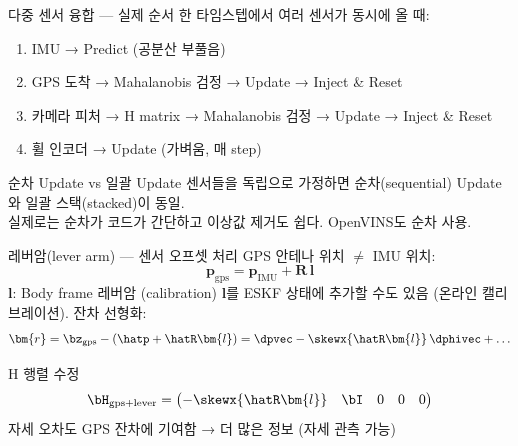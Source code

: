 \begin{frame}{다중 센서 융합 — 실제 순서}
  한 타임스텝에서 여러 센서가 동시에 올 때:
  \vspace{0.3em}
  \begin{enumerate}
    \item IMU → Predict (공분산 부풀음)
    \item GPS 도착 → Mahalanobis 검정 → Update → Inject \& Reset
    \item 카메라 피처 → H matrix → Mahalanobis 검정 → Update → Inject \& Reset
    \item 휠 인코더 → Update (가벼움, 매 step)
  \end{enumerate}
  \pause
  \vspace{0.3em}
  \begin{alertblock}{순차 Update vs 일괄 Update}
    센서들을 독립으로 가정하면 순차(sequential) Update와 일괄 스택(stacked)이 동일.\\
    실제로는 순차가 코드가 간단하고 이상값 제거도 쉽다. OpenVINS도 순차 사용.
  \end{alertblock}
\end{frame}

\begin{frame}{레버암(lever arm) — 센서 오프셋 처리}
  GPS 안테나 위치 $\ne$ IMU 위치:
  \[
    \bm{p}_\text{gps} = \bm{p}_\text{IMU} + \bm{R}\,\bm{l}
  \]
  $\bm{l}$: Body frame 레버암 (calibration)
  \vspace{0.3em}
  \pause
  $\bm{l}$를 ESKF 상태에 추가할 수도 있음 (온라인 캘리브레이션).
  \vspace{0.2em}
  잔차 선형화:
  \[
    \bm{r} = \bz_\text{gps} - (\hatp + \hatR\bm{l}) = \dpvec - \skewx{\hatR\bm{l}}\,\dphivec + \ldots
  \]
  \pause
  \begin{block}{H 행렬 수정}
    \[
      \bH_\text{gps+lever} = \begin{pmatrix}
        -\skewx{\hatR\bm{l}} & \bI & 0 & 0 & 0
      \end{pmatrix}
    \]
    자세 오차도 GPS 잔차에 기여함 → 더 많은 정보 (자세 관측 가능)
  \end{block}
\end{frame}

